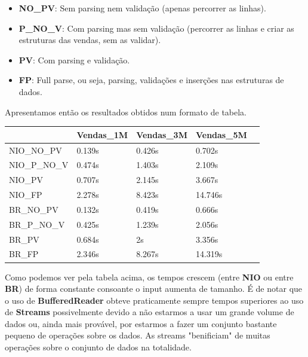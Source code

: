 \documentclass[11pt]{article}
\begin{document}
\begin{itemize}
    \item \textbf{NO\_PV}: Sem parsing nem validação (apenas percorrer as linhas).
    \item \textbf{P\_NO\_V}: Com parsing mas sem validação (percorrer as linhas e criar as estruturas das vendas, sem as validar).
    \item \textbf{PV}: Com parsing e validação.
    \item \textbf{FP}: Full parse, ou seja, parsing, validações e inserções nas estruturas de dados.
\end{itemize}

Apresentamos então os resultados obtidos num formato de tabela.

\vspace{0.5cm}
\begin{tabularx}{\textwidth} {
  | >{\centering\arraybackslash}X
  | >{\centering\arraybackslash}X
  | >{\centering\arraybackslash}X
  | >{\centering\arraybackslash}X
  | >{\centering\arraybackslash}X | }
    \hline
     & Vendas\_1M  & Vendas\_3M  & Vendas\_5M  \\
    \hline
    NIO\_NO\_PV & 0.139s & 0.426s & 0.702s  \\
    \hline
    NIO\_P\_NO\_V & 0.474s & 1.403s & 2.109s \\
    \hline
    NIO\_PV & 0.707s & 2.145s & 3.667s \\
    \hline
    NIO\_FP & 2.278s & 8.423s & 14.746s \\
    \hline
    BR\_NO\_PV & 0.132s & 0.419s & 0.666s  \\
    \hline
    BR\_P\_NO\_V & 0.425s & 1.239s & 2.056s \\
    \hline
    BR\_PV & 0.684s & 2s & 3.356s \\
    \hline
    BR\_FP & 2.346s & 8.267s & 14.319s \\
    \hline
\end{tabularx}
\vspace{0.5cm}

Como podemos ver pela tabela acima, os tempos crescem (entre \textbf{NIO} ou entre \textbf{BR}) de forma constante consoante o input aumenta de tamanho. É de notar que o uso de \textbf{BufferedReader} obteve praticamente sempre tempos superiores ao uso de \textbf{Streams} possivelmente devido a não estarmos a usar um grande volume de dados ou, ainda mais provável, por estarmos a fazer um conjunto bastante pequeno de operações sobre os dados. As streams "benificiam" de muitas operações sobre o conjunto de dados na totalidade.
\end{document}
